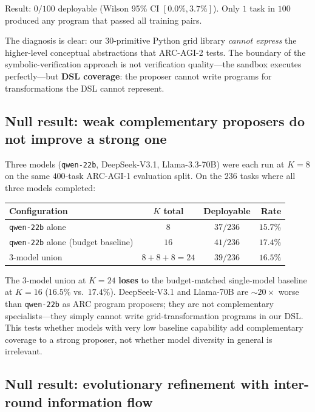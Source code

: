 \documentclass[11pt]{amsart}
\newcommand\1{{\mathds{1}}}
\theoremstyle{definition}
\theoremstyle{remark}
\numberwithin{equation}{section}
\begin{document}
Result: $0/100$ deployable (Wilson 95\% CI $[0.0\%, 3.7\%]$).
Only $1$ task in $100$ produced any program that passed all training pairs.

The diagnosis is clear: our $30$-primitive Python grid library \emph{cannot express} the higher-level conceptual abstractions that ARC-AGI-2 tests.
The boundary of the symbolic-verification approach is not verification quality---the sandbox executes perfectly---but \textbf{DSL coverage}: the proposer cannot write programs for transformations the DSL cannot represent.

\subsection{Null result: weak complementary proposers do not improve a strong one}\label{app:heterogeneous}

Three models (\texttt{qwen-22b}, DeepSeek-V3.1, Llama-3.3-70B) were each run at $K\!=\!8$ on the same $400$-task ARC-AGI-1 evaluation split.
On the $236$ tasks where all three models completed:

\begin{center}\small
\begin{tabular}{lccr}
\toprule
Configuration & $K$ total & Deployable & Rate \\
\midrule
\texttt{qwen-22b} alone & $8$ & $37/236$ & $15.7\%$ \\
\texttt{qwen-22b} alone (budget baseline) & $16$ & $41/236$ & $17.4\%$ \\
$3$-model union & $8{+}8{+}8{=}24$ & $39/236$ & $16.5\%$ \\
\bottomrule
\end{tabular}
\end{center}

The $3$-model union at $K\!=\!24$ \textbf{loses} to the budget-matched single-model baseline at $K\!=\!16$ ($16.5\%$ vs.\ $17.4\%$).
DeepSeek-V3.1 and Llama-70B are $\sim\!20\times$ worse than \texttt{qwen-22b} as ARC program proposers; they are not complementary specialists---they simply cannot write grid-transformation programs in our DSL.
This tests whether models with very low baseline capability add complementary coverage to a strong proposer, not whether model diversity in general is irrelevant.

\subsection{Null result: evolutionary refinement with inter-round information flow}\label{app:evolutionary}
\end{document}

